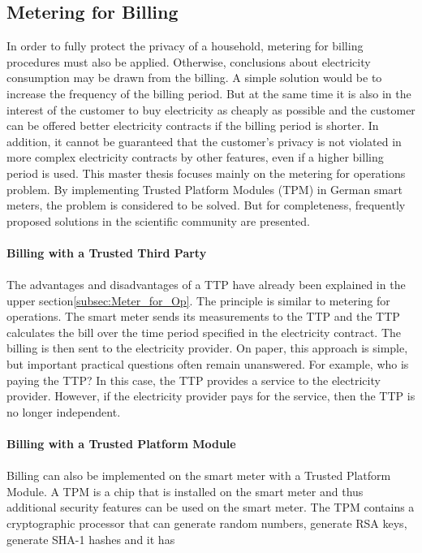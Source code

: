 \subsection{Metering for Billing}
In order to fully protect the privacy of a household, metering for billing procedures must also be applied. Otherwise, conclusions about electricity consumption may be drawn from the billing. A simple solution would be to increase the frequency of the billing period. But at the same time it is also in the interest of the customer to buy electricity as cheaply as possible and the customer can be offered better electricity contracts if the billing period is shorter. In addition, it cannot be guaranteed that the customer's privacy is not violated in more complex electricity contracts by other features, even if a higher billing period is used. %
This master thesis focuses mainly on the metering for operations problem. 
By implementing Trusted Platform Modules (TPM) in German smart meters, the problem is considered to be solved. But for completeness, frequently proposed solutions in the scientific community are presented.\\
\\
\textbf{Billing with a Trusted Third Party}
\\
\\
The advantages and disadvantages of a \gls{TTP} have already been explained in the upper section\ref{subsec:Meter_for_Op}. The principle is similar to metering for operations. The smart meter sends its measurements to the \gls{TTP} and the \gls{TTP} calculates the bill over the time period specified in the electricity contract. The billing is then sent to the electricity provider. On paper, this approach is simple, but important practical questions often remain unanswered. For example, who is paying the \gls{TTP}? In this case, the \gls{TTP} provides a service to the electricity provider. However, if the electricity provider pays for the service, then the \gls{TTP} is no longer independent.\\
\\
\textbf{Billing with a Trusted Platform Module}
\\
\\
Billing can also be implemented on the smart meter with a Trusted Platform Module. A TPM is a chip that is installed on the smart meter and thus additional security features can be used on the smart meter. The TPM contains a cryptographic processor that can generate random numbers, generate RSA keys, generate SHA-1 hashes and it has
